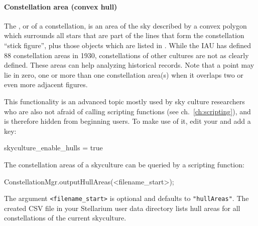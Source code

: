 \paragraph{Constellation area (convex hull)}
\label{SC:constellation_area}
The , or  of a constellation, 
is an area of the sky described by a convex polygon which surrounds all stars that are part of the lines that form the constellation ``stick figure'', 
plus those objects which are listed in . 
While the IAU has defined 88 constellation areas in 1930, constellations of other cultures are not as clearly defined. These areas can help analyzing historical records.
Note that a point may lie in zero, one or more than one constellation area(s) when it overlaps two or even more adjacent figures. 

This functionality is an advanced topic mostly used by sky culture researchers \citep[e.g.][94-98]{Hoffmann2017a} who are also not afraid of calling scripting functions (see ch.~\ref{ch:scripting}), 
and is therefore hidden from beginning users. To make use of it, edit your  and add a key:
\begin{configfile}
[gui]
skyculture_enable_hulls = true 
\end{configfile}


The constellation areas of a skyculture can be queried by a scripting function:
\begin{script}
ConstellationMgr.outputHullAreas(<filename_start>);
\end{script}
The argument \texttt{<filename\_start>} is optional and defaults to \texttt{"hullAreas"}. 
The created CSV file  in your Stellarium user data directory lists hull areas for all constellations of the current skyculture. 


